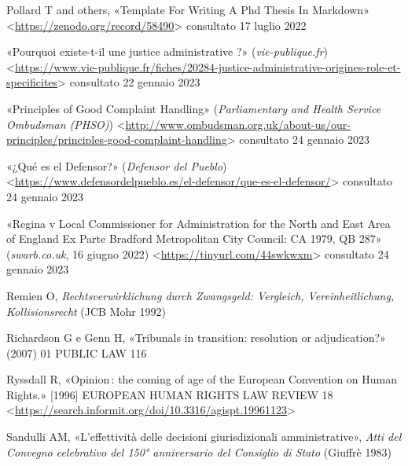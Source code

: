 \documentclass[12pt,it,a4paper,]{report}
\newlength{\cslhangindent}
\newenvironment{CSLReferences}[2] %
 {%
  \setlength{\parindent}{0pt}
  \ifodd #1 \everypar{\setlength{\hangindent}{\cslhangindent}}\ignorespaces\fi
  \ifnum #2 > 0
  \setlength{\parskip}{#2\baselineskip}
  \fi
 }%
 {}
\begin{document}
\begin{CSLReferences}{0}{0}
\leavevmode{}%
Pollard T and others, {«Template For Writing A Phd Thesis In Markdown»}
\textless{}\url{https://zenodo.org/record/58490}\textgreater{}
consultato 17 luglio 2022

\leavevmode{}%
{«Pourquoi existe-t-il une justice administrative ?»}
(\emph{vie-publique.fr})
\textless{}\url{https://www.vie-publique.fr/fiches/20284-justice-administrative-origines-role-et-specificites}\textgreater{}
consultato 22 gennaio 2023

\leavevmode{}%
{«Principles of Good Complaint Handling»} (\emph{Parliamentary and
Health Service Ombudsman (PHSO)})
\textless{}\url{http://www.ombudsman.org.uk/about-us/our-principles/principles-good-complaint-handling}\textgreater{}
consultato 24 gennaio 2023

\leavevmode{}%
{«¿Qué es el Defensor?»} (\emph{Defensor del Pueblo})
\textless{}\url{https://www.defensordelpueblo.es/el-defensor/que-es-el-defensor/}\textgreater{}
consultato 24 gennaio 2023

\leavevmode{}%
{«Regina v Local Commissioner for Administration for the North and East
Area of England Ex Parte Bradford Metropolitan City Council: CA 1979, QB
287»} (\emph{swarb.co.uk}, 16 giugno 2022)
\textless{}\url{https://tinyurl.com/44swkwxm}\textgreater{} consultato
24 gennaio 2023

\leavevmode{}%
Remien O, \emph{Rechtsverwirklichung durch Zwangsgeld: Vergleich,
Vereinheitlichung, Kollisionsrecht} (JCB Mohr 1992)

\leavevmode{}%
Richardson G e Genn H, {«Tribunals in transition: resolution or
adjudication?»} (2007) 01 PUBLIC LAW 116

\leavevmode{}%
Ryssdall R, {«Opinion\,: the coming of age of the European Convention on
Human Rights.»} {[}1996{]} EUROPEAN HUMAN RIGHTS LAW REVIEW 18
\textless{}\url{https://search.informit.org/doi/10.3316/agispt.19961123}\textgreater{}

\leavevmode{}%
Sandulli AM, {«L'effettività delle decisioni giurisdizionali
amministrative»}, \emph{Atti del Convegno celebrativo del 150°
anniversario del Consiglio di Stato} (Giuffrè 1983)


\end{CSLReferences}
\end{document}
